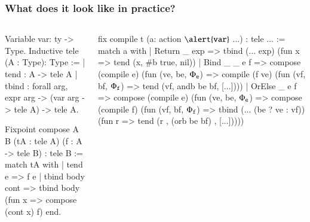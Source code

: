 \documentclass[9pt]{beamer}
\begin{document}
\begin{frame}[fragile]
  \frametitle{What does it look like in practice?}

  \begin{columns}
\begin{coq}
Variable var: ty -> Type. 
Inductive tele (A : Type): Type :=
| tend : A -> tele A
| tbind : forall arg, expr arg -> 
  (var arg -> tele A) -> tele A.   
 
Fixpoint compose {A B}
                 (tA : tele  A)
                 (f : A -> tele  B) : tele  B :=
match tA with
  | tend e => f e
  | tbind body cont => 
    tbind  body (fun x => compose (cont x) f)
end.
\end{coq}

\begin{coq}
fix compile {t} (a: action $\alert{\tt var}$ ...) : tele ... := 
match a with 
  | Return _ exp =>  
      tbind (... exp) (fun x => 
      tend (x, #b true, nil))
  | Bind _ _ e f => 
      compose (compile e) (fun (ve, be, $\Phi_{\tt e}$) =>
      compile (f ve) (fun (vf, bf, $\Phi_{\tt f}$) =>
      tend (vf, andb be bf, [...])))             
  | OrElse _ e f => 
      compose (compile e) (fun (ve, be, $\Phi_{\tt e}$) =>
      compose (compile f) (fun (vf, bf, $\Phi_{\tt f}$) =>
      tbind (... (be ? ve : vf)) (fun r => 
      tend (r , (orb be bf) , [...]))))
  \end{coq}
  \end{columns}
\end{frame}
\end{document}
